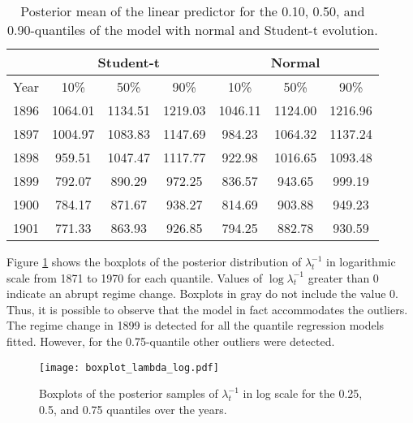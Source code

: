 \documentclass[12pt,a4paper]{article}\usepackage[]{graphicx}\usepackage[]{color}\usepackage{subfigure}
\begin{document}
% 

\begin{table}[h!]
\caption{Posterior mean of the linear predictor for the 0.10, 0.50, and 0.90-quantiles of 
the model with normal and Student-t evolution.\label{tabela_Nile}}
\centering
\begin{tabular}{|c|ccc|ccc|}
\cline{2-7}
\multicolumn{1}{c}{}&\multicolumn{3}{|c|}{Student-t} &\multicolumn{3}{c|}{Normal}\\\hline
Year & 10\% & 50\% & 90\% & 10\% & 50\% & 90\%\\\hline
1896 & 1064.01 & 1134.51 & 1219.03 & 1046.11 & 1124.00 & 1216.96\\
1897 & 1004.97 & 1083.83 & 1147.69 & 984.23 & 1064.32 & 1137.24\\
1898 &  959.51 & 1047.47 & 1117.77 & 922.98 & 1016.65 & 1093.48\\
1899 & 792.07  & 890.29  & 972.25 & 836.57 & 943.65 & 999.19\\
1900 & 784.17  & 871.67  & 938.27 & 814.69 & 903.88 & 949.23\\
1901 & 771.33  & 863.93  & 926.85 & 794.25 & 882.78 & 930.59\\\hline
\end{tabular}
\end{table}

Figure \ref{boxplot_lambdat} shows the boxplots of the posterior distribution of $\lambda_t^{-1}$ in logarithmic scale from 1871 to 1970 for each quantile. 
Values of $\log \lambda_t^{-1}$ greater than 0 indicate an abrupt regime change. 
Boxplots in gray do not include the value 0. 
Thus, it is possible to observe that the model in fact accommodates the outliers. 
The regime change in 1899 is detected for all the quantile regression models fitted. 
However, for the 0.75-quantile other outliers were detected.


\clearpage

\begin{figure}[!htb]
\begin{center}
{\texttt{[image: boxplot\_lambda\_log.pdf]}}  
	\vspace{-0.3 cm}\caption{Boxplots of the posterior samples of $\lambda_t^{-1}$ in log scale for the 0.25, 0.5, and 0.75 quantiles over the years.}\label{boxplot_lambdat}
\end{center}	
\end{figure}
\end{document}
